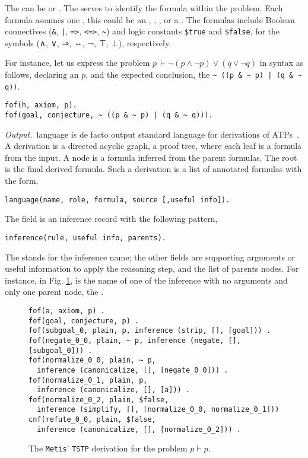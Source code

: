 \documentclass[../main.tex]{subfiles}
\begin{document}
The  can be  or . The 
serves to identify the formula within the problem. Each formula
assumes one , this could be an ,
, , or a .
The formulas include Boolean connectives (\verb!&!, \verb!|!,
\verb!=>!, \verb!<=>!, \verb!~!) and logic constants \verb!$true!
and \verb!$false!, for the symbols (∧, ∨, ⇒, ⇔, ¬, ⊤, ⊥), respectively.

For instance, let us express the problem
$p\, \vdash \neg (p \wedge \neg p) \vee (q \vee \neg q)$
in \TPTP syntax as follows, declaring an \tptpaxiom $p$, and the
expected conclusion, the  \tptpconjecture
\verb!~ ((p & ~ p) | (q & ~ q))!.

\begin{verbatim}
fof(h, axiom, p).
fof(goal, conjecture, ~ ((p & ~ p) | (q & ~ q))).
\end{verbatim}

\textit{Output.}~\TSTP language is de facto output standard language
for derivations of ATPs~\cite{sutcliffe2004tstp}. A \TSTP derivation
is a directed acyclic graph, a proof tree, where each leaf is a
formula from the \TPTP input. A node is a formula inferred from the
parent formulas. The root is the final derived formula. Such a
derivation is a list of annotated formulas with the form,

\begin{verbatim}
language(name, role, formula, source [,useful info]).
\end{verbatim}

The  field is an inference record with the following
pattern,

\begin{verbatim}
inference(rule, useful info, parents).
\end{verbatim}

The  stands for the inference name; the other fields are
supporting arguments or useful information to apply the reasoning
step, and the list of parents nodes. For instance, in Fig.
\ref{fig:metis-proof-tstp}, \strip is the name of one of the
inference with no arguments and only one parent node, the
.

\begin{figure}
\begin{verbatim}
fof(a, axiom, p) .
fof(goal, conjecture, p) .
fof(subgoal_0, plain, p, inference (strip, [], [goal])) .
fof(negate_0_0, plain, ~ p, inference (negate, [], [subgoal_0])) .
fof(normalize_0_0, plain, ∼ p,
  inference (canonicalize, [], [negate_0_0])) .
fof(normalize_0_1, plain, p,
  inference (canonicalize, [], [a])) .
fof(normalize_0_2, plain, $false,
  inference (simplify, [], [normalize_0_0, normalize_0_1]))
cnf(refute_0_0, plain, $false,
  inference (canonicalize, [], [normalize_0_2])) .
\end{verbatim}
\caption{The \texttt{Metis}' \texttt{TSTP} derivation for the
problem $p\vdash p$.}
\label{fig:metis-proof-tstp}
\end{figure}
\end{document}
